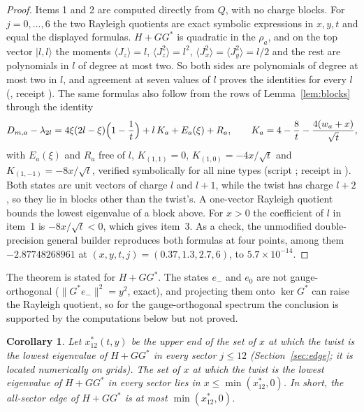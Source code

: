 \documentclass[11pt]{article}
\newtheorem{corollary}[theorem]{Corollary}
\theoremstyle{definition}
\theoremstyle{remark}
\newcommand{\norm}[1]{\lVert #1\rVert}
\begin{document}
\begin{proof}
Items 1 and 2 are computed directly from $Q$, with no charge blocks. For $j=0,\dots,6$ the two Rayleigh quotients are
exact symbolic expressions in $x,y,t$ and equal the displayed formulas. $H+GG^*$ is quadratic in the $\rho_a$, and on
the top vector $|l,l\rangle$ the moments $\langle J_z\rangle=l$, $\langle J_z^2\rangle=l^2$,
$\langle J_x^2\rangle=\langle J_y^2\rangle=l/2$ and the rest are polynomials in $l$ of degree at most two. So both sides
are polynomials of degree at most two in $l$, and agreement at seven values of $l$ proves the identities for every $l$
(, receipt ).
The same formulas also follow from the rows of Lemma~\ref{lem:blocks} through the identity
\begin{equation}\label{eq:Dident}
  D_{m,a}-\lambda_{2l}=4\xi(2l-\xi)\Bigl(1-\frac1t\Bigr)+l\,K_a+E_a(\xi)+R_a,\qquad
  K_a=4-\frac8t-\frac{4(w_a+x)}{\sqrt t},
\end{equation}
with $E_a(\xi)$ and $R_a$ free of $l$, $K_{(1,1)}=0$, $K_{(1,0)}=-4x/\sqrt t$ and $K_{(1,-1)}=-8x/\sqrt t$, verified
symbolically for all nine types (script ; receipt  in
). Both states are unit vectors of charge $l$ and $l+1$, while the
twist has charge $l+2$, so they lie in blocks other than the twist's. A one-vector Rayleigh quotient bounds the lowest
eigenvalue of a block above. For $x>0$ the coefficient of $l$ in item~1 is $-8x/\sqrt t<0$, which gives item~3. As a
check, the unmodified double-precision general builder reproduces both formulas at four points, among them
$-2.87748268961$ at $(x,y,t,j)=(0.37,1.3,2.7,6)$, to $5.7\times10^{-14}$.
\end{proof}

The theorem is stated for $H+GG^*$. The states $e_-$ and $e_0$ are not gauge-orthogonal ($\norm{G^*e_-}^2=y^2$, exact),
and projecting them onto $\ker G^*$ can raise the Rayleigh quotient, so for the gauge-orthogonal spectrum the conclusion
is supported by the computations below but not proved.

\begin{corollary}\label{cor:edgebound}
Let $x^*_{12}(t,y)$ be the upper end of the set of $x$ at which the twist is the lowest eigenvalue of $H+GG^*$ in every
sector $j\le12$ (Section~\ref{sec:edge}; it is located numerically on grids). The set of $x$ at which the twist is the
lowest eigenvalue of $H+GG^*$ in every sector lies in $x\le\min(x^*_{12},0)$. In short, the all-sector edge of $H+GG^*$
is at most $\min(x^*_{12},0)$.
\end{corollary}
\end{document}
